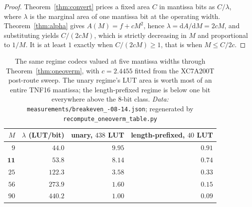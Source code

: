 \begin{proof}
Theorem~\ref{thm:convert} prices a fixed area $C$ in mantissa bits as $C/\lambda$,
where $\lambda$ is the marginal area of one mantissa bit at the operating width.
Theorem~\ref{thm:alpha} gives $A(M) = f + cM^{2}$, hence
$\lambda = \mathrm{d}A/\mathrm{d}M = 2cM$, and substituting yields $C/(2cM)$, which
is strictly decreasing in $M$ and proportional to $1/M$. It is at least $1$ exactly
when $C/(2cM) \ge 1$, that is when $M \le C/2c$.
\end{proof}

\begin{table}[t]\centering
\caption{The same regime codecs valued at five mantissa widths through
Theorem~\ref{thm:oneoverm}, with $c = 2.4455$ fitted from the XC7A200T post-route sweep. The unary
regime's LUT area is worth most of an entire TNF16 mantissa; the length-prefixed
regime is below one bit everywhere above the 8-bit class. \emph{Data:} \texttt{measurements/\allowbreak breakeven\_-08-14.json}; regenerated by \texttt{recompute\_\allowbreak oneoverm\_\allowbreak table.py}}
\label{tab:oneoverm}
\begin{tabular}{rrrr}
\toprule
$M$ & $\lambda$ (LUT/bit) & unary, $438$ LUT & length-prefixed, $40$ LUT \\
\midrule
$9$  & $44.0$  & $9.95$ & $0.91$ \\
$\mathbf{11}$ & $\mathbf{53.8}$  & $\mathbf{8.14}$ & $\mathbf{0.74}$ \\
$25$ & $122.3$ & $3.58$ & $0.33$ \\
$56$ & $273.9$ & $1.60$ & $0.15$ \\
$90$ & $440.2$ & $1.00$ & $0.09$ \\
\bottomrule
\end{tabular}
\end{table}

